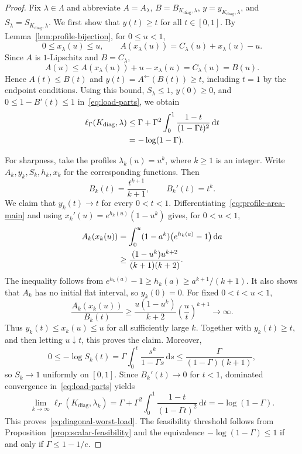 \documentclass[11pt]{article}
\theoremstyle{definition}
\theoremstyle{remark}
\newcommand{\dd}{\,\mathrm d}
\begin{document}
\begin{proof}
Fix $\lambda\in\Lambda$ and abbreviate $A=A_\lambda$, $B=B_{K_{\mathrm{diag}},\lambda}$, $y=y_{K_{\mathrm{diag}},\lambda}$, and $S_\lambda=S_{K_{\mathrm{diag}},\lambda}$.
We first show that $y(t)\ge t$ for all $t\in[0,1]$.
By Lemma~\ref{lem:profile-bijection}, for $0\le u<1$,
\[
 0\le x_\lambda(u)\le u,
 \qquad A(x_\lambda(u))=C_\lambda(u)+x_\lambda(u)-u.
\]
Since $A$ is $1$-Lipschitz and $B=C_\lambda$,
\[
 A(u)\le A(x_\lambda(u))+u-x_\lambda(u)=C_\lambda(u)=B(u).
\]
Hence $A(t)\le B(t)$ and $y(t)=A^{\leftarrow}(B(t))\ge t$, including $t=1$ by the endpoint conditions.
Using this bound, $S_\lambda\le1$, $y(0)\ge0$, and $0\le1-B'(t)\le1$ in~\eqref{eq:load-parts}, we obtain
\begin{align}\label{eq:diagonal-upper-bound}
 \ell_\Gamma(K_{\mathrm{diag}},\lambda)
 &\le\Gamma+\Gamma^2\int_0^1
           \frac{1-t}{(1-\Gamma t)^2}\dd t\notag\\
 &=-\log(1-\Gamma).
\end{align}

For sharpness, take the profiles $\lambda_k(u)=u^k$, where $k\ge1$ is an integer.
Write $A_k,y_k,S_k,h_k,x_k$ for the corresponding functions.
Then
\[
 B_k(t)=\frac{t^{k+1}}{k+1},
 \qquad B_k'(t)=t^k.
\]
We claim that $y_k(t)\to t$ for every $0<t<1$.
Differentiating~\eqref{eq:profile-area-main} and using
$x_k'(u)=e^{h_k(u)}(1-u^k)$ gives, for $0<u<1$,
\begin{align}\label{eq:diagonal-sharp-area}
 A_k(x_k(u))
 &=\int_0^u(1-a^k)\bigl(e^{h_k(a)}-1\bigr)\dd a\notag\\
 &\ge\frac{(1-u^k)u^{k+2}}{(k+1)(k+2)}.
\end{align}
The inequality follows from $e^{h_k(a)}-1\ge h_k(a)\ge a^{k+1}/(k+1)$.
It also shows that $A_k$ has no initial flat interval, so $y_k(0)=0$.
For fixed $0<t<u<1$,
\[
 \frac{A_k(x_k(u))}{B_k(t)}
 \ge\frac{u(1-u^k)}{k+2}
       \left(\frac{u}{t}\right)^{k+1}
 \longrightarrow\infty.
\]
Thus $y_k(t)\le x_k(u)\le u$ for all sufficiently large $k$.
Together with $y_k(t)\ge t$, and then letting $u\downarrow t$, this proves the claim.
Moreover,
\[
 0\le-\log S_k(t)
 =\Gamma\int_0^t\frac{s^k}{1-\Gamma s}\dd s
 \le\frac{\Gamma}{(1-\Gamma)(k+1)},
\]
so $S_k\to1$ uniformly on $[0,1]$.
Since $B_k'(t)\to0$ for $t<1$, dominated convergence in~\eqref{eq:load-parts} yields
\[
 \lim_{k\to\infty}\ell_\Gamma(K_{\mathrm{diag}},\lambda_k)
 =\Gamma+\Gamma^2\int_0^1\frac{1-t}{(1-\Gamma t)^2}\dd t
 =-\log(1-\Gamma).
\]
This proves~\eqref{eq:diagonal-worst-load}.
The feasibility threshold follows from Proposition~\ref{prop:scalar-feasibility} and the equivalence
$-\log(1-\Gamma)\le1$ if and only if $\Gamma\le1-1/e$.
\end{proof}
\end{document}
